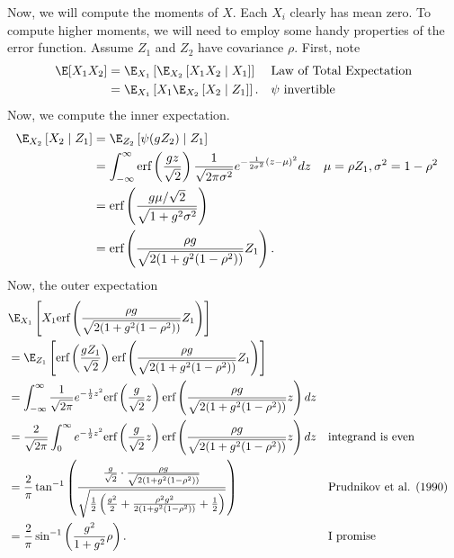 \documentclass{article}
\begin{document}
Now, we will compute the moments of $X$.
Each $X_i$ clearly has mean zero.
To compute higher moments, we will need to employ some handy properties of the error function.
Assume $Z_1$ and $Z_2$ have covariance $\rho$.
First, note
\begin{align}
  \E[ X_1 X_2 ]
  &= \E_{X_1}\left[ \E_{X_2}\left[ X_1 X_2 \mid X_1 \right] \right] && \text{Law of Total Expectation} \\
  &= \E_{X_1}\left[ X_1 \E_{X_2}\left[ X_2 \mid Z_1 \right] \right]. && \text{$\psi$ invertible}
\end{align}
Now, we compute the inner expectation.
\begin{align}
  \E_{X_2}\left[ X_2 \mid Z_1 \right]
  &= \E_{Z_2}\left[ \psi(g Z_2) \mid Z_1 \right] \\
  &= \int_{-\infty}^{\infty} \text{erf}\left( \frac{g z}{\sqrt{2}} \right) \frac{1}{\sqrt{2\pi \sigma^2}} e^{-\frac{1}{2 \sigma^2} \left( z - \mu \right)^2} dz && \mu = \rho Z_1, \sigma^2 = 1 - \rho^2 \\
  &= \text{erf}\left( \frac{ g \mu / \sqrt{2} }{ \sqrt{ 1 + g^2 \sigma^2 } } \right) \\
  &= \text{erf}\left( \frac{ \rho g }{ \sqrt{ 2( 1 + g^2 (1 - \rho^2) ) } } Z_1 \right).
\end{align}
Now, the outer expectation
\begin{align}
  &\E_{X_1} \left[  X_1 \text{erf}\left( \frac{ \rho g }{ \sqrt{ 2( 1 + g^2 (1 - \rho^2) ) } } Z_1 \right) \right] \\
  &= \E_{Z_1} \left[ \text{erf} \left( \frac{g Z_1}{\sqrt{2}} \right) \text{erf}\left( \frac{ \rho g }{ \sqrt{ 2( 1 + g^2 (1 - \rho^2) ) } } Z_1 \right) \right] \\
  &= \int_{-\infty}^{\infty} \frac{1}{\sqrt{2\pi}} e^{-\frac{1}{2} z^2} \text{erf} \left( \frac{g}{\sqrt{2}} z \right) \text{erf}\left( \frac{ \rho g }{ \sqrt{ 2( 1 + g^2 (1 - \rho^2) ) } } z \right) dz \\
  &= \frac{2}{\sqrt{2 \pi}} \int_{0}^{\infty} e^{-\frac{1}{2} z^2} \text{erf} \left( \frac{g}{\sqrt{2}} z \right) \text{erf}\left( \frac{ \rho g }{ \sqrt{ 2( 1 + g^2 (1 - \rho^2) ) } } z \right) dz && \text{integrand is even} \\
  &= \frac{2}{\pi} \tan^{-1} \left( \frac{ \frac{g}{\sqrt{2}} \cdot \frac{ \rho g }{ \sqrt{ 2( 1 + g^2 (1 - \rho^2) ) } } }{ \sqrt{ \frac{1}{2} \left( \frac{g^2}{2} + \frac{ \rho^2 g^2 }{ 2( 1 + g^2 (1 - \rho^2) ) } + \frac{1}{2} \right) } } \right) && \text{Prudnikov et al. (1990)} \\
  &= \frac{2}{\pi}\sin^{-1}\left(\frac{g^{2}}{1+g^{2}}\rho\right). && \text{I promise}
\end{align}
\end{document}

